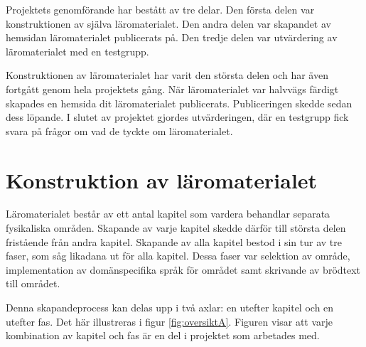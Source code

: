 \begin{binge}

Projektets genomförande har bestått av tre delar. Den första delen var konstruktionen av själva läromaterialet. Den andra delen var skapandet av hemsidan läromaterialet publicerats på. Den tredje delen var utvärdering av läromaterialet med en testgrupp.

Konstruktionen av läromaterialet har varit den största delen och har även fortgått genom hela projektets gång. När läromaterialet var halvvägs färdigt skapades en hemsida dit läromaterialet publicerats. Publiceringen skedde sedan dess löpande. I slutet av projektet gjordes utvärderingen, där en testgrupp fick svara på frågor om vad de tyckte om läromaterialet.

\section{Konstruktion av läromaterialet}

Läromaterialet består av ett antal kapitel som vardera behandlar separata fysikaliska områden. Skapande av varje kapitel skedde därför till största delen fristående från andra kapitel. Skapande av alla kapitel bestod i sin tur av tre faser, som såg likadana ut för alla kapitel. Dessa faser var selektion av område, implementation av domänspecifika språk för området samt skrivande av brödtext till området.

Denna skapandeprocess kan delas upp i två axlar: en utefter kapitel och en utefter fas. Det här illustreras i figur \ref{fig:oversiktA}. Figuren visar att varje kombination av kapitel och fas är en del i projektet som arbetades med.


\end{binge}
